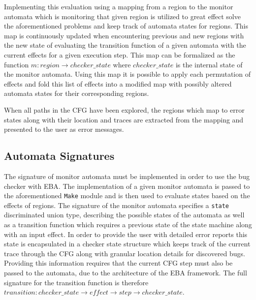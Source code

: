 \newpar Implementing this evaluation using a mapping from a region to the monitor automata which is monitoring that given region is utilized to great effect solve the aforementioned problems and keep track of automata states for regions. This map is continuously updated when encountering previous and new regions with the new state of evaluating the transition function of a given automata with the current effects for a given execution step. This map can be formalized as the function $m: region \rightarrow { checker\_state }$ where $ checker\_state $ is the internal state of the monitor automata. Using this map it is possible to apply each permutation of effects and fold this list of effects into a modified map with possibly altered automata states for their corresponding regions. 

\newpar When all paths  in the CFG have been explored, the regions which map to error states along with their location and traces are extracted from the mapping and presented to the user as error messages. 

\subsection{Automata Signatures}

The signature of monitor automata must be implemented in order to use the bug checker with EBA. The implementation of a given monitor automata is passed to the aforementioned \texttt{Make} module and is then used to evaluate states based on the effects of regions. The signature of the monitor automata specifies a \texttt{state} discriminated union type, describing the possible states of the automata as well as a transition function which requires a previous state of the state machine along with an input effect. In order to provide the user with detailed error reports this state is encapsulated in a checker state structure which keeps track of the current trace through the CFG along with granular location details for discovered bugs. Providing this information requires that the current CFG step must also be passed to the automata, due to the architecture of the EBA framework. The full signature for the transition function is therefore $transition: \mathit{checker\_state} \rightarrow \mathit{effect} \rightarrow \mathit{step} \rightarrow \mathit{checker\_state}$. 